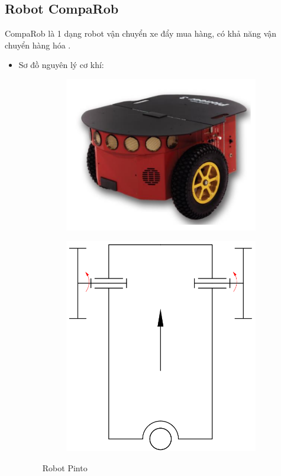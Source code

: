     \subsection{Robot CompaRob}
        \hspace*{0.6cm} CompaRob là 1 dạng robot vận chuyển xe đẩy mua hàng, có khả năng vận chuyển hàng hóa \cite{comparob_robot}.
        \begin{itemize}
            \item Sơ đồ nguyên lý cơ khí:
            \begin{figure}[H]
                \begin{subfigure}{0.5\textwidth}
                \centering
                \includegraphics[width=0.6\linewidth, right]{pictures/chapter1/chapter1_pic11a_comparob.png} 
                \label{chap1_pic11a}
                \end{subfigure}
                \begin{subfigure}{0.6\textwidth}
                \includegraphics[width=0.5\linewidth]{pictures/chapter1/chapter1_pic11b_pinto.png}
                \label{chap1_pic11b}
                \end{subfigure}
                \caption{Robot Pinto}
                \label{chap1_pic11}

\end{figure}
\end{itemize}
